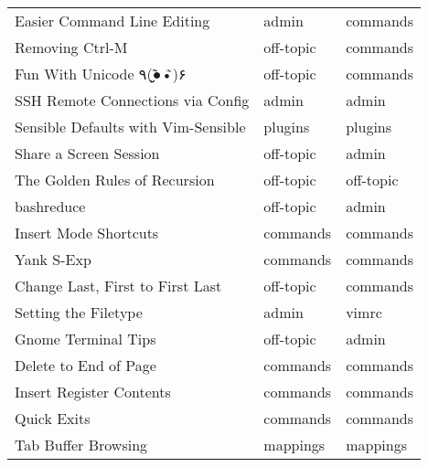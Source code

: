 \begin{tabular}{lll}
 Easier Command Line Editing               & admin       & commands  \\
 Removing Ctrl-M                           & off-topic   & commands  \\
 Fun With Unicode ٩(●̮̮̃•̃)۶                   & off-topic   & commands  \\
 SSH Remote Connections via Config         & admin       & admin     \\
 Sensible Defaults with Vim-Sensible       & plugins     & plugins   \\
 Share a Screen Session                    & off-topic   & admin     \\
 The Golden Rules of Recursion             & off-topic   & off-topic \\
 bashreduce                                & off-topic   & admin     \\
 Insert Mode Shortcuts                     & commands    & commands  \\
 Yank S-Exp                                & commands    & commands  \\
 Change Last, First to First Last          & off-topic   & commands  \\
 Setting the Filetype                      & admin       & vimrc     \\
 Gnome Terminal Tips                       & off-topic   & admin     \\
 Delete to End of Page                     & commands    & commands  \\
 Insert Register Contents                  & commands    & commands  \\
 Quick Exits                               & commands    & commands  \\
 Tab Buffer Browsing                       & mappings    & mappings  \\
\hline
\end{tabular}
